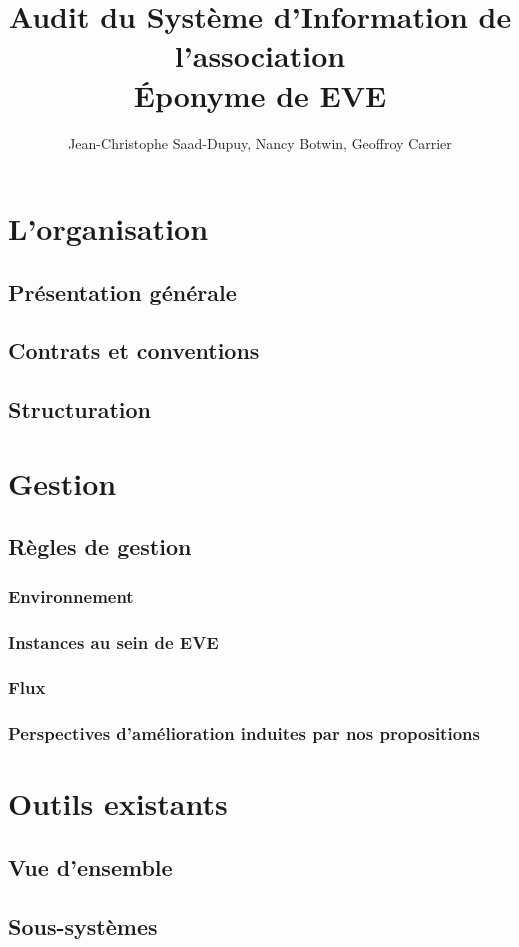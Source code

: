 \documentclass[a4wide,10pt,2pages]{article}
\title{Audit du Système d'Information de l'association \\ \Huge{Éponyme de EVE}}
\author{Jean-Christophe Saad-Dupuy, Nancy Botwin, Geoffroy Carrier}
\begin{document}
\maketitle

\tableofcontents

\section{L'organisation}
\subsection{Présentation générale}
\subsection{Contrats et conventions}
\subsection{Structuration}
\section{Gestion}
\subsection{Règles de gestion}
\subsubsection{Environnement}
\subsubsection{Instances au sein de EVE}
\subsubsection{Flux}
\subsubsection{Perspectives d'amélioration induites par nos propositions}
\section{Outils existants}
\subsection{Vue d'ensemble}
\subsection{Sous-systèmes}
\end{document}
